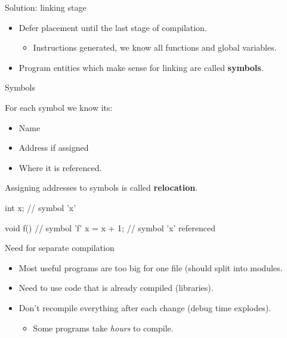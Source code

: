 \documentclass[xcolor={usenames,dvipsnames}]{beamer}
\begin{document}
\begin{frame}{Solution: linking stage}
    \begin{itemize}
 
\item  Defer placement until the last stage of compilation.
    \begin{itemize}
 \item  Instructions generated, we know all functions and global variables.
    \end{itemize} 
\item  Program entities which make sense for linking are called \textbf{symbols}.
\end{itemize} 

\end{frame}



\begin{frame}[fragile]{Symbols}

For each symbol we know its:
    \begin{itemize}

        \item  Name
        \item  Address if assigned
        \item  Where it is referenced.
\end{itemize} 
     Assigning addresses to symbols is called \textbf{relocation}.

\begin{cexample}
int x;          // symbol 'x'

void f() {      // symbol 'f'
    x = x + 1;  // symbol 'x' referenced
}
\end{cexample}


\end{frame}

\begin{frame}{Need for separate compilation}
    \begin{itemize}
        \item Most useful programs are too big for one file (should split into modules.
        \item Need to use code that is already compiled (libraries).
        \item  Don't recompile everything after each change (debug time explodes).
            \begin{itemize}
                \item  Some programs take \emph{hours} to compile.
            \end{itemize}
    \end{itemize} 

\end{frame}
\end{document}
